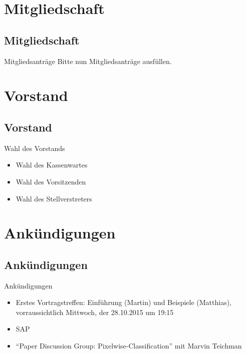 \section{Mitgliedschaft}\subsection*{Mitgliedschaft}
\begin{frame}{Mitgliedsanträge}
    Bitte nun Mitgliedsanträge ausfüllen.
\end{frame}

\section{Vorstand}\subsection*{Vorstand}
\begin{frame}{Wahl des Vorstands}
    \begin{itemize}
        \item Wahl des Kassenwartes
        \item Wahl des Vorsitzenden
        \item Wahl des Stellverstreters
    \end{itemize}
\end{frame}

\section{Ankündigungen}\subsection*{Ankündigungen}
\begin{frame}{Ankündigungen}
    \begin{itemize}
        \item Erstes Vortragstreffen: Einführung (Martin) und Beispiele
              (Matthias), vorraussichtlich Mittwoch, der 28.10.2015 um 19:15
        \item SAP
        \item \enquote{Paper Discussion Group: Pixelwise-Classification} mit
              Marvin Teichman
    \end{itemize}
\end{frame}